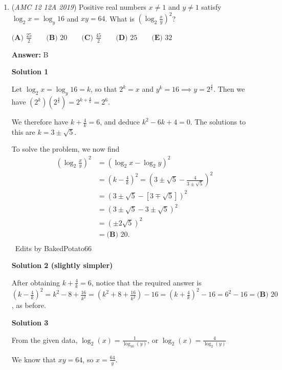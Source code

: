 \begin{enumerate}
 Education, the Study of Everything

 


	\item (\textit{AMC 12 12A 2019}) Positive real numbers $x \neq 1$ and $y \neq 1$ satisfy $\log_2{x} = \log_y{16}$ and $xy = 64$. What is $(\log_2{\frac{x}{y}})^2$?


 $\textbf{(A) } \frac{25}{2} \qquad\textbf{(B) } 20 \qquad\textbf{(C) } \frac{45}{2} \qquad\textbf{(D) } 25 \qquad\textbf{(E) } 32$

 \textbf{Answer: }B



\textbf{Solution 1}

Let $\log_2{x} = \log_y{16}=k$, so that $2^k=x$ and $y^k=16 \implies y=2^{\frac{4}{k}}$. Then we have $(2^k)(2^{\frac{4}{k}})=2^{k+\frac{4}{k}}=2^6$.

 We therefore have $k+\frac{4}{k}=6$, and deduce $k^2-6k+4=0$. The solutions to this are $k = 3 \pm \sqrt{5}$. 

 To solve the problem, we now find 
 \begin{align*} (\log_2\frac{x}{y})^2&=(\log_2 x - \log_2 y)^2\\ &=(k-\frac{4}{k})^2=(3 \pm \sqrt{5} - \frac{4}{3 \pm \sqrt{5}})^2 \\ &= (3 \pm \sqrt{5} - [3 \mp \sqrt{5}])^2\\ &= (3 \pm \sqrt{5} - 3 \pm \sqrt{5})^2\\ &=(\pm 2\sqrt{5})^2 \\ &= \boxed{\textbf{(B) } 20}. \\ \end{align*}
~Edits by BakedPotato66

 



\textbf{Solution 2 (slightly simpler)}

After obtaining $k + \frac{4}{k} = 6$, notice that the required answer is $\left(k - \frac{4}{k}\right)^{2} = k^2 - 8 + \frac{16}{k^2} = \left(k^2 + 8 + \frac{16}{k^2}\right) - 16 = \left(k+\frac{4}{k}\right)^2 - 16 = 6^2 - 16 = \boxed{\textbf{(B) } 20}$, as before.

 



\textbf{Solution 3}

From the given data, $\log_2(x) = \frac{1}{\log_{16}(y)}$, or $\log_2(x) = \frac{4}{{\log_{2}(y)}}$

 We know that $xy=64$, so $x= \frac{64}{y}$.


\end{enumerate}
